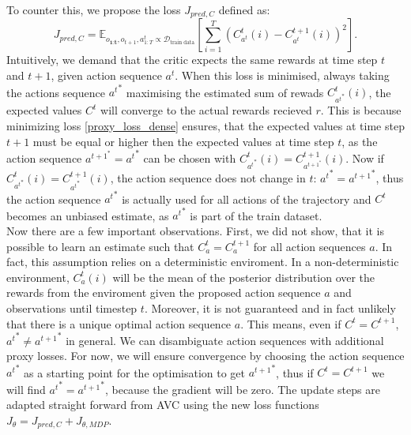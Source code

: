 To counter this, we propose the loss $J_{pred, C}$ defined as:
\begin{equation}
    \label{proxy_loss_dense}
    J_{pred, C} = \mathbb{E}_{o_{\textbf{1:t}} , o_{t+1}, a^t_{1:T} \propto \mathcal{D}_{\text{train data}}}\left[ \sum_{i=1}^T(C_{{a^t}}^t(i) - C_{{a^t}}^{t+1}(i))^2 \right].
\end{equation}
Intuitively, we demand that the critic expects the same rewards at time step $t$ and $t+1$, given action sequence $a^t$. When this loss is minimised, always taking the actions sequence ${a^t}^*$ maximising the estimated sum of 
rewads $C_{{a^t}^*}^t(i)$, 
the expected values $C^t$ will converge to the actual rewards recieved $r$. This is because minimizing loss \ref{proxy_loss_dense} ensures, that the expected 
values at time step $t+1$ must be equal or higher then the expected values at time step $t$, as the action sequence $a^{t+1}^* = {a^t}^*$ can be chosen with 
$C_{{a^t}^*}^t(i) = C_{a^{t+1}^*}^{t+1}(i)$. Now if $C_{{a^t}^*}^t(i) = C_{{a^t}^*}^{t+1}(i)$, the action sequence does not change in $t$: ${a^t}^* = {a^{t+1}}^*$, thus the action 
sequence ${a^t}^*$ is actually used for all actions of the trajectory and $C^t$ becomes an unbiased estimate, as ${a^t}^*$ is part of the train dataset. \\

Now there are a few important observations. First, we did not show, that it is possible to learn an estimate such that $C_a^t = C_a^{t+1}$ for all action sequences $a$. 
In fact, this assumption relies on a deterministic 
enviroment. In a non-deterministic environment, $C_a^t(i)$ will be the mean of the posterior distribution over the rewards from the enviroment given the proposed action sequence $a$ 
and observations until timestep $t$. 
Moreover, it is not guaranteed and in fact unlikely that there is a unique optimal action sequence $a$. This means, even if $C^t = C^{t+1}$, ${a^t}^* \neq {a^{t+1}}^*$ in general. We can 
disambiguate action sequences with additional proxy losses. 
For now, we will ensure convergence by choosing the action sequence ${a^t}^*$ as a starting point for the optimisation to get ${a^{t+1}}^*$, thus if $C^t = C^{t+1}$ we will find 
${a^t}^* = {a^{t+1}}^*$, because the gradient will be zero. 
The update 
steps are adapted straight forward from AVC using the new loss functions $J_{\theta} = J_{pred, C} + J_{\theta, MDP}$. 

